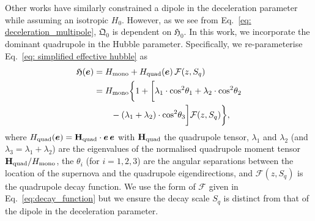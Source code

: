 \documentclass[fleqn,usenatbib]{mnras}
\begin{document}
Other works have {similarly constrained a dipole in the deceleration parameter}
while %
{assuming} an isotropic $H_0$.
However, as we see from Eq.~\eqref{eq: deceleration_multipole}, $\mathfrak{Q}_0$ is dependent on $\mathfrak{H}_0$. 
In this work, we incorporate {the} %
{dominant quadrupole in} the Hubble parameter. Specifically, %
we re-parameterise Eq.~\eqref{eq: simplified effective hubble} as
\begin{equation}
\begin{aligned}\label{eq:h_quad}
    \mathfrak{H}(\boldsymbol{e}) &= H_{\rm mono} + H_{\rm quad}(\boldsymbol{e})\, \mathcal{F}(z,S_q) \\
    &= H_{\rm mono} \bigg\{1 + \bigg[\lambda_1 \cdot {\rm cos}^2\theta_1+ \lambda_2 \cdot {\rm cos}^2\theta_2 \\
    &\quad\quad - (\lambda_1 + \lambda_2) \cdot {\rm cos}^2\theta_3\bigg]\mathcal{F}(z,S_q) \bigg\},
\end{aligned}
\end{equation}
where {%
$H_{\rm quad}(\boldsymbol{e})={\bf H_{\rm quad}}\cdot \boldsymbol{e}\, \boldsymbol{e}$ with
${\bf H_{\rm quad}}$ the quadrupole tensor,} $\lambda_1$ and $ \lambda_2$ {(and $\lambda_3 = \lambda_1 + \lambda_2 $)} are the eigenvalues of the {normalised} quadrupole moment tensor {${\bf H_{\rm quad}}/H_{\rm mono}$}, {the $\theta_i$ (for $i=1,2,3$)} are the angular separations between the location of the supernova and the quadrupole eigendirections, and $\mathcal{F}(z,S_q)$ is the quadrupole decay function. {We use the form of $\mathcal{F}$ given in Eq.~\eqref{eq:decay_function} but we ensure the decay scale $S_q$ is distinct from that of the dipole in the deceleration parameter.}
\end{document}
